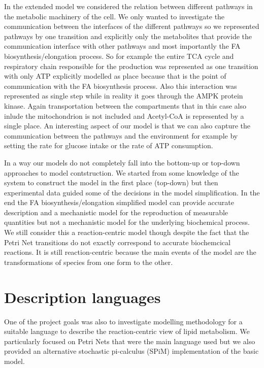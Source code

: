 In the extended model we considered the relation between different
pathways in the metabolic machinery of the cell. We only wanted to
investigate the communication between the interfaces of the different
pathways so we represented pathways by one transition and explicitly
only the metabolites that provide the communication interface with
other pathways and most importantly the FA biosynthesis/elongation
process. So for example the entire TCA cycle and respiratory chain
responsible for the production was represented as one transition with
only ATP explicitly modelled as place because that is the point of
communication with the FA biosynthesis process. Also this interaction
was represented as single step while in reality it goes through the
AMPK protein kinase. Again transportation between the compartments
that in this case also inlude the mitochondrion is not included and
Acetyl-CoA is represented by a single place. An interesting aspect of
our model is that we can also capture the communication between the
pathways and the environment for example by setting the rate for
glucose intake or the rate of ATP consumption.

In a way our models do not completely fall into the bottom-up or
top-down approaches to model contstruction. We started from some
knowledge of the system to construct the model in the first place
(top-down) but then experimental data guided some of the decisions in
the model simplification. In the end the FA biosynthesis/elongation
simplified model can provide accurate description and a mechanistic model for the reproduction of
measurable quantities but not a mechanistic model for the underlying
biochemical process. We still consider this a reaction-centric model
though despite the fact that the Petri Net transitions do not exactly
correspond to accurate biochemcical reactions. It is still
reaction-centric because the main events of the model are the
transformations of species from one form to the other.

\section{Description languages}
One of the project goals was also to investigate modelling methodology
for a suitable language to describe the reaction-centric view of lipid
metabolism. We particularly focused on Petri Nets that were the main
language used but we also provided an alternative stochastic
pi-calculus (SPiM) implementation of the basic model.

